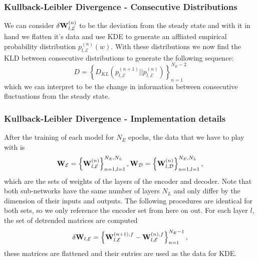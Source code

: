 \documentclass[11pt,aspectratio=169]{beamer}
\newcommand{\parens}[1]{\left(#1\right)}
\newcommand{\bracks}[1]{\left\{#1\right\}}
\begin{document}
    \begin{frame}
        \frametitle{Kullback-Leibler Divergence - Consecutive Distributions}
        We can consider 
        $\delta{\bf W}_{l,\mathcal{E}}^{(n)}$ to be the deviation from the steady state and with it 
        in hand we flatten it's data and use KDE to generate an affliated empirical probability 
        distribution $p_{l,\mathcal{E}}^{(n)}(w)$. With these distributions we now find the KLD 
        between consecutive distributions to generate the following sequence: 
        \begin{equation}
            D = \bracks{D_{KL}\parens{p_{l,\mathcal{E}}^{(n+1)} \Big|\!\Big| p_{l,\mathcal{E}}^{(n)}}}_{n=1}^{N_E - 2}
        \end{equation}
        which we can interpret to be the change in information between consecutive fluctuations from the 
        steady state.
    \end{frame}

    \begin{frame}
        \frametitle{Kullback-Leibler Divergence - Implementation details}
        After the training of each model for $N_E$ epochs, the 
        data that we have to play with is 
        \begin{equation}
            {\bf W}_\mathcal{E} = \bracks{{\bf W}_{l,\mathcal{E}}^{(n)}}_{n=1, l=1}^{N_E, N_L}, 
            {\bf W}_\mathcal{D} = \bracks{{\bf W}_{l,\mathcal{D}}^{(n)}}_{n=1, l=1}^{N_E, N_L}, 
        \end{equation}
        which are the sets of weights of the layers of the encoder and decoder. Note that both sub-networks 
        have the same number of layers $N_L$ and only differ by the dimension of their inputs and outputs.
        The following procedures are identical for both sets, so we only reference the encoder set
        from here on out. For each layer $l$, the set of detrended matrices are computed
        \begin{equation}
            \delta{\bf W}_{l, \mathcal{E}} = \bracks{{\bf W}_{l,\mathcal{E}}^{(n+1),f} - {\bf W}_{l,\mathcal{E}}^{(n),f}}_{n=1}^{N_E-1},
        \end{equation}
        these matrices are flattened and their entries are used as the data for KDE.
    \end{frame}
\end{document}
